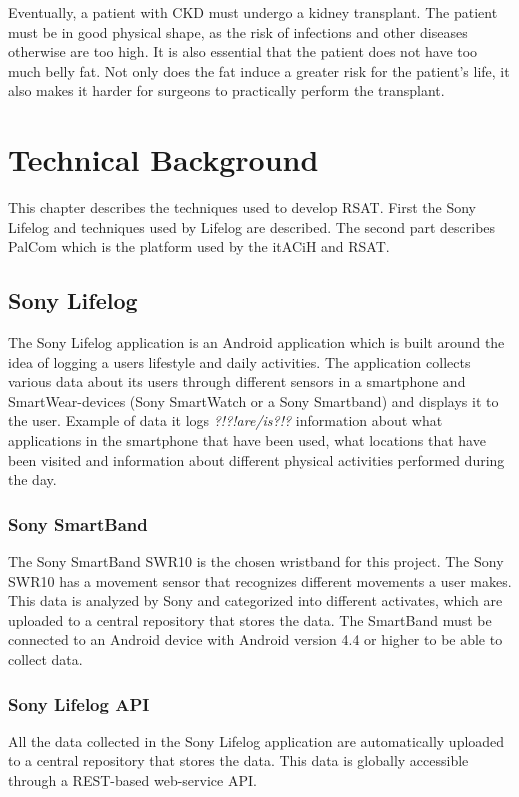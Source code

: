 \documentclass{cslthse-msc}
\begin{document}
Eventually, a patient with CKD must undergo a kidney transplant. The patient must be in good physical shape, as the risk of infections and other diseases otherwise are too high. It is also essential that the patient does not have too much belly fat. Not only does the fat induce a greater risk for the patient's life, it also makes it harder for surgeons to practically perform the transplant. %

\chapter[Technical Background]{Technical Background}

This chapter describes the techniques used to develop RSAT. First the Sony Lifelog and techniques used by Lifelog are described. The second part describes PalCom which is the platform used by the itACiH and RSAT. 

\section{Sony Lifelog}

The Sony Lifelog application is an Android application which is built around the idea of logging a users lifestyle and daily activities\cite{LifeLogDescr}. The application collects various data about its users through different sensors in a smartphone and SmartWear-devices (Sony SmartWatch or a Sony Smartband) and displays it to the user. Example of data it logs \emph{?!?!are/is?!?}  information about what applications in the smartphone that have been used, what locations that have been visited and information about different physical activities performed during the day.  

\subsection{Sony SmartBand}

The Sony SmartBand SWR10 is the chosen wristband for this project. The Sony SWR10 has a movement sensor that recognizes different movements a user makes\cite{SWR10}. This data is analyzed by Sony and categorized into different activates, which are uploaded to a central repository that stores the data. The SmartBand must be connected to an Android device with Android version 4.4 or higher to be able to collect data.

\subsection{Sony Lifelog API} 
All the data collected in the Sony Lifelog application are automatically uploaded to a central repository that stores the data. This data is globally accessible through a REST-based web-service API\cite{LifeLogDescr}. 
\end{document}
